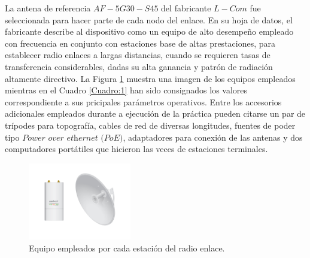 \documentclass[conference]{IEEEtran}
\begin{document}
La antena de referencia $AF-5G30-S45$ del fabricante $L-Com$ fue seleccionada para hacer parte de cada nodo del enlace. En su hoja de datos, el fabricante
describe al dispositivo como un equipo de alto desempeño empleado con frecuencia en conjunto con estaciones base de altas prestaciones, para establecer 
radio enlaces a largas distancias, cuando se requieren tasas de transferencia considerables, dadas su alta ganancia y patrón de radiación altamente directivo. 
La Figura \ref{fig:Equipos} muestra una imagen de los equipos empleados mientras en el Cuadro \ref{Cuadro:1} han sido consignados los valores correspondiente a sus pricipales parámetros
operativos. Entre los accesorios adicionales empleados durante a ejecución de la práctica pueden citarse un par de trípodes para topografía, cables de red de
diversas longitudes, fuentes de poder tipo $\textit{Power over ethernet (PoE)}$, adaptadores para conexión de las antenas y dos computadores portátiles que hicieron 
las veces de estaciones terminales.  
\begin{figure}
    \centering
          \includegraphics[width=0.4\textwidth]{Equipos.png}
        \caption{Equipo empleados por cada estación del radio enlace.
        }
        \label{fig:Equipos}
\end{figure}
\end{document}
